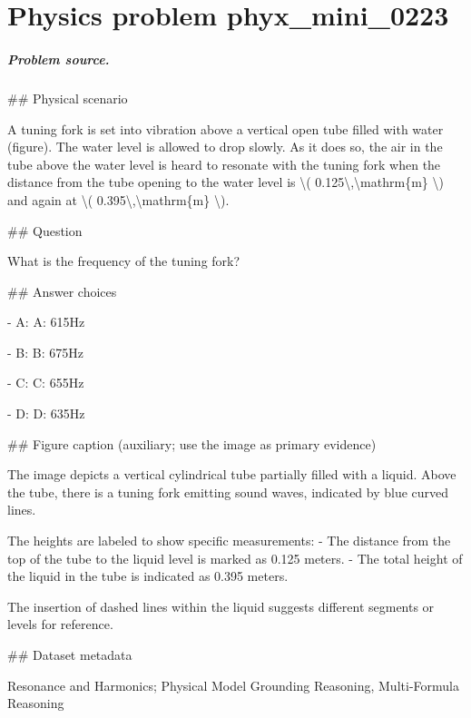 
\chapter{Physics problem phyx\_mini\_0223}
\label{ch:PhyXMiniProblems_problem_phyx_mini_0223}

\paragraph{Problem source.}
\#\# Physical scenario

A tuning fork is set into vibration above a vertical open tube filled with water (figure). The water level is allowed to drop slowly. As it does so, the air in the tube above the water level is heard to resonate with the tuning fork when the distance from the tube opening to the water level is \textbackslash{}( 0.125\textbackslash{},\textbackslash{}mathrm\{m\} \textbackslash{}) and again at \textbackslash{}( 0.395\textbackslash{},\textbackslash{}mathrm\{m\} \textbackslash{}).

\#\# Question

What is the frequency of the tuning fork?

\#\# Answer choices

- A: A: 615Hz

- B: B: 675Hz

- C: C: 655Hz

- D: D: 635Hz

\#\# Figure caption (auxiliary; use the image as primary evidence)

The image depicts a vertical cylindrical tube partially filled with a liquid. Above the tube, there is a tuning fork emitting sound waves, indicated by blue curved lines. 

The heights are labeled to show specific measurements:
- The distance from the top of the tube to the liquid level is marked as 0.125 meters.
- The total height of the liquid in the tube is indicated as 0.395 meters. 

The insertion of dashed lines within the liquid suggests different segments or levels for reference.

\#\# Dataset metadata

Resonance and Harmonics; Physical Model Grounding Reasoning, Multi-Formula Reasoning

